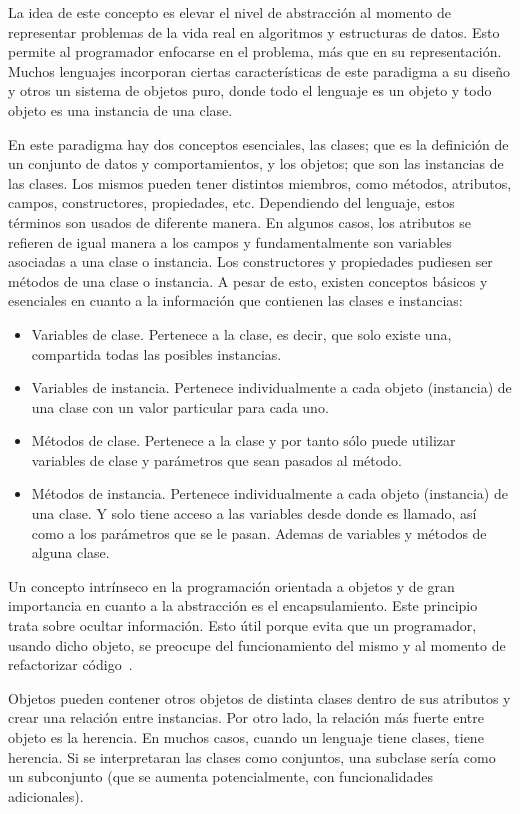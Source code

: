 \documentclass[12pt,letterpaper,titlepage,oneside,openright]{book}
\begin{document}
La idea de este concepto es elevar el nivel de abstracción al momento de representar problemas de la vida real en algoritmos y estructuras de datos. Esto permite al programador enfocarse en el problema, más que en su representación. Muchos lenguajes incorporan ciertas características de este paradigma a su diseño y otros un sistema de objetos puro, donde todo el lenguaje es un objeto y todo objeto es una instancia de una clase.

En este paradigma hay dos conceptos esenciales, las clases; que es la definición de un conjunto de datos y comportamientos, y los objetos; que son las instancias de las clases. Los mismos pueden tener distintos miembros, como métodos, atributos, campos, constructores, propiedades, etc. Dependiendo del lenguaje, estos términos son usados de diferente manera. En algunos casos, los atributos se refieren de igual manera a los campos y fundamentalmente son variables asociadas a una clase o instancia. Los constructores y propiedades pudiesen ser métodos de una clase o instancia. A pesar de esto, existen conceptos básicos y esenciales en cuanto a la información que contienen las clases e instancias:

\begin{itemize}
    \item Variables de clase. Pertenece a la clase, es decir, que solo existe una, compartida todas las posibles instancias.
    \item Variables de instancia. Pertenece individualmente a cada objeto (instancia) de una clase con un valor particular para cada uno.
    \item Métodos de clase. Pertenece a la clase y por tanto sólo puede utilizar variables de clase y parámetros que sean pasados al método.
    \item Métodos de instancia. Pertenece individualmente a cada objeto (instancia) de una clase. Y solo tiene acceso a las variables desde donde es llamado, así como a los parámetros que se le pasan. Ademas de variables y métodos de alguna clase.
\end{itemize}

Un concepto intrínseco en la programación orientada a objetos y de gran importancia en cuanto a la abstracción es el encapsulamiento. Este principio trata sobre ocultar información. Esto útil porque evita que un programador, usando dicho objeto, se preocupe del funcionamiento del mismo y al momento de refactorizar código~\cite{scott2000programming}.

Objetos pueden contener otros objetos de distinta clases dentro de sus atributos y crear una relación entre instancias. Por otro lado, la relación más fuerte entre objeto es la herencia. En muchos casos, cuando un lenguaje tiene clases, tiene herencia. Si se interpretaran las clases como conjuntos, una subclase sería como un subconjunto (que se aumenta potencialmente, con funcionalidades adicionales).
\end{document}
